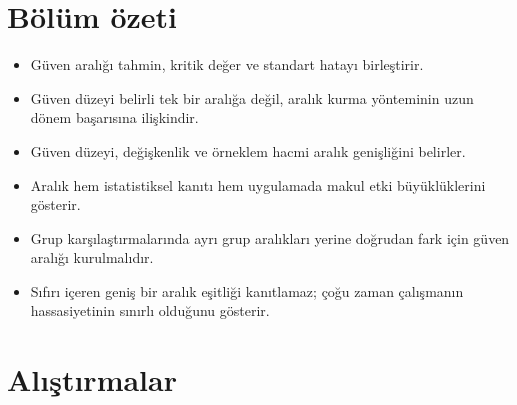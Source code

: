 



\section{Bölüm özeti}

\begin{itemize}
  \item Güven aralığı tahmin, kritik değer ve standart hatayı birleştirir.
  \item Güven düzeyi belirli tek bir aralığa değil, aralık kurma yönteminin uzun dönem başarısına ilişkindir.
  \item Güven düzeyi, değişkenlik ve örneklem hacmi aralık genişliğini belirler.
  \item Aralık hem istatistiksel kanıtı hem uygulamada makul etki büyüklüklerini gösterir.
  \item Grup karşılaştırmalarında ayrı grup aralıkları yerine doğrudan fark
  için güven aralığı kurulmalıdır.
  \item Sıfırı içeren geniş bir aralık eşitliği kanıtlamaz; çoğu zaman
  çalışmanın hassasiyetinin sınırlı olduğunu gösterir.
\end{itemize}

\section*{Alıştırmalar}

